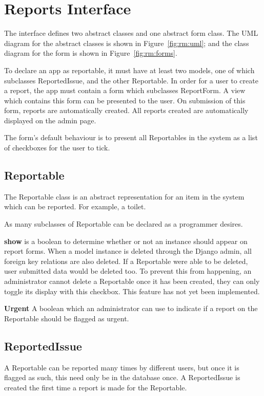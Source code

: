 \FloatBarrier
\section{Reports Interface}
The interface defines two abstract classes and one abstract form class. The UML diagram for the abstract classes is shown in Figure~\ref{fig:rm:uml}; and the class diagram for the form is shown in Figure~\ref{fig:rm:forms}.

To declare an app as reportable, it must have at least two models, one of which subclasses ReportedIssue, and the other Reportable. In order for a user to create a report, the app must contain a form which subclasses ReportForm. A view which contains this form can be presented to the user. On submission of this form, reports are automatically created. All reports created are automatically displayed on the admin page.

The form's default behaviour is to present all Reportables in the system as a list of checkboxes for the user to tick.

\subsection{Reportable}
The Reportable class is an abstract representation for an item in the system which can be reported. For example, a toilet.

As many subclasses of Reportable can be declared as a programmer desires.

\textbf{show} is a boolean to determine whether or not an instance should appear on report forms. When a model instance is deleted through the Django admin, all foreign key relations are also deleted. If a Reportable were able to be deleted, user submitted data would be deleted too. To prevent this from happening, an administrator cannot delete a Reportable once it has been created, they can only toggle its display with this checkbox. This feature has not yet been implemented.

\textbf{Urgent} A boolean which an administrator can use to indicate if a report on the Reportable should be flagged as urgent.

\subsection{ReportedIssue}
A Reportable can be reported many times by different users, but once it is flagged as such, this need only be in the database once. A ReportedIssue is created the first time a report is made for the Reportable.

